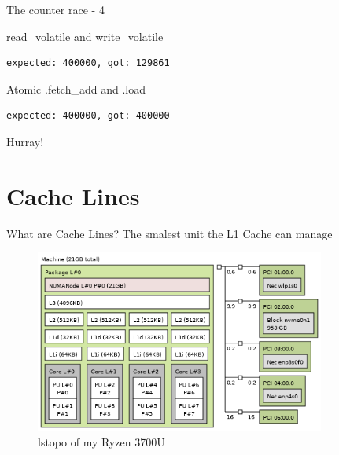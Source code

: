 \documentclass[10pt,aspectratio=169]{beamer}
\begin{document}
\begin{frame}[fragile]{The counter race - 4}

      \begin{block}{read\_volatile and write\_volatile}
\begin{verbatim}
expected: 400000, got: 129861
\end{verbatim}
      \end{block}

      \begin{alertblock}{Atomic .fetch\_add and .load}
\begin{verbatim}
expected: 400000, got: 400000
\end{verbatim}
      \end{alertblock}

    Hurray!
\end{frame}




\section{Cache Lines}

\begin{frame}{What are Cache Lines?}
    The smalest unit the \alert{L1 Cache} can manage

\begin{figure}
    \includegraphics[height=6cm]{./lstopo.png}
    \caption{lstopo of my Ryzen 3700U}
\end{figure}
\end{frame}
\end{document}

